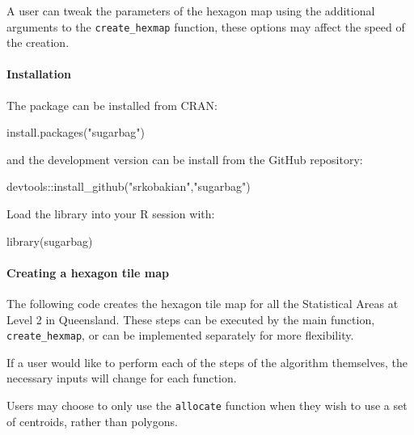 A user can tweak the parameters of the hexagon map using the additional
arguments to the \texttt{create\_hexmap} function, these options may
affect the speed of the creation.

\hypertarget{installation}{%
\paragraph{Installation}\label{installation}}

The package can be installed from CRAN:

\begin{Schunk}
\begin{Sinput}
install.packages("sugarbag")
\end{Sinput}
\end{Schunk}

and the development version can be install from the GitHub repository:

\begin{Schunk}
\begin{Sinput}
devtools::install_github("srkobakian","sugarbag")
\end{Sinput}
\end{Schunk}

Load the library into your R session with:

\begin{Schunk}
\begin{Sinput}
library(sugarbag)
\end{Sinput}
\end{Schunk}

\hypertarget{creating-a-hexagon-tile-map}{%
\paragraph{Creating a hexagon tile
map}\label{creating-a-hexagon-tile-map}}

The following code creates the hexagon tile map for all the Statistical
Areas at Level 2 in Queensland. These steps can be executed by the main
function, \texttt{create\_hexmap}, or can be implemented separately for
more flexibility.

If a user would like to perform each of the steps of the algorithm
themselves, the necessary inputs will change for each function.

Users may choose to only use the \texttt{allocate} function when they
wish to use a set of centroids, rather than \citep{sf} polygons.

